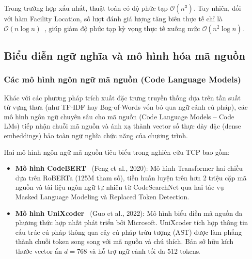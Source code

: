 Trong trường hợp xấu nhất, thuật toán có độ phức tạp $\mathcal{O}(n^3)$. Tuy nhiên, đối với hàm Facility Location, số lượt đánh giá lượng tăng biên thực tế chỉ là $\mathcal{O}(n \log n)$~\cite{minoux1978accelerated, falcon2026}, giúp giảm độ phức tạp kỳ vọng thực tế xuống mức $\mathcal{O}(n^2 \log n)$.

\subsection{Biểu diễn ngữ nghĩa và mô hình hóa mã nguồn}
\label{subsec:semantic_code_representation}

\subsubsection{Các mô hình ngôn ngữ mã nguồn (Code Language Models)}
\label{subsubsec:code_language_models}

Khác với các phương pháp trích xuất đặc trưng truyền thống dựa trên tần suất từ vựng thưa (như TF-IDF hay Bag-of-Words vốn bỏ qua ngữ cảnh cú pháp), các mô hình ngôn ngữ chuyên sâu cho mã nguồn (Code Language Models -- Code LMs) tiếp nhận chuỗi mã nguồn và ánh xạ thành vector số thực dày đặc (dense embeddings) bảo toàn ngữ nghĩa chức năng của chương trình.

Hai mô hình ngôn ngữ mã nguồn tiêu biểu trong nghiên cứu TCP bao gồm:
\begin{itemize}
    \item \textbf{Mô hình CodeBERT}~\cite{feng2020codebert} (Feng et al., 2020): Mô hình Transformer hai chiều dựa trên RoBERTa (125M tham số), tiền huấn luyện trên hơn 2 triệu cặp mã nguồn và tài liệu ngôn ngữ tự nhiên từ CodeSearchNet qua hai tác vụ Masked Language Modeling và Replaced Token Detection.
    \item \textbf{Mô hình UniXcoder}~\cite{guo2022unixcoder} (Guo et al., 2022): Mô hình biểu diễn mã nguồn đa phương thức hợp nhất phát triển bởi Microsoft. UniXcoder tích hợp thông tin cấu trúc cú pháp thông qua cây cú pháp trừu tượng (AST) được làm phẳng thành chuỗi token song song với mã nguồn và chú thích. Bản  sở hữu kích thước vector ẩn $d = 768$ và hỗ trợ ngữ cảnh tối đa 512 tokens.
\end{itemize}

